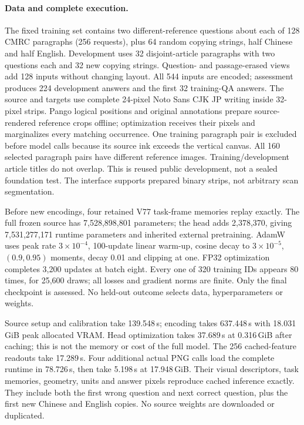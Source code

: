 \paragraph{Data and complete execution.}
The fixed training set contains two different-reference questions about each
of 128 CMRC paragraphs (256 requests), plus 64 random copying strings, half
Chinese and half English. Development uses 32 disjoint-article paragraphs
with two questions each and 32 new copying strings. Question- and
passage-erased views add 128 inputs without changing layout. All 544 inputs
are encoded; assessment produces 224 development answers and the first
32 training-QA answers. The source and targets use complete 24-pixel Noto Sans
CJK JP writing inside 32-pixel strips. Pango logical positions and original
annotations prepare source-rendered reference crops offline; optimization
receives their pixels and marginalizes every matching occurrence. One
training paragraph pair is excluded before model calls because its source
ink exceeds the vertical canvas. All 160 selected paragraph pairs have
different reference images. Training/development article titles do not
overlap. This is reused public development, not a sealed foundation test.
The interface supports prepared binary strips, not arbitrary scan segmentation.

Before new encodings, four retained V77 task-frame memories replay exactly.
The full frozen source has 7,528,898,801 parameters; the head adds 2,378,370,
giving 7,531,277,171 runtime parameters and inherited external pretraining.
AdamW uses peak rate $3\times10^{-4}$, 100-update linear warm-up, cosine
decay to $3\times10^{-5}$, $(0.9,0.95)$ moments, decay 0.01 and clipping at
one. FP32 optimization completes 3,200 updates at batch eight. Every one of
320 training IDs appears 80 times, for 25,600 draws; all losses and gradient
norms are finite. Only the final checkpoint is assessed. No held-out outcome
selects data, hyperparameters or weights.

Source setup and calibration take 139.548\,s; encoding takes 637.448\,s with
18.031\,GiB peak allocated VRAM. Head optimization takes 37.689\,s at
0.316\,GiB after caching; this is not the memory or cost of the full model.
The 256 cached-feature readouts take 17.289\,s. Four additional actual PNG
calls load the complete runtime in 78.726\,s, then take 5.198\,s at
17.948\,GiB. Their visual descriptors, task memories, geometry, units and
answer pixels reproduce cached inference exactly. They include both the
first wrong question and next correct question, plus the first new Chinese
and English copies. No source weights are downloaded or duplicated.

